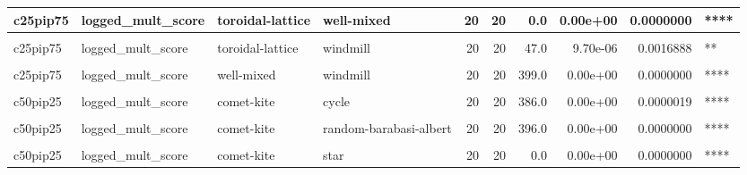 \documentclass[
]{book}
\begin{document}
\begin{table}
\begin{tabular}{l|l|l|l|r|r|r|r|r|l}
\hline
c25pip75 & logged\_mult\_score & toroidal-lattice & well-mixed & 20 & 20 & 0.0 & 0.00e+00 & 0.0000000 & ****\\
\hline
\cellcolor{gray!6}{c25pip75} & \cellcolor{gray!6}{logged\_mult\_score} & \cellcolor{gray!6}{toroidal-lattice} & \cellcolor{gray!6}{wheel} & \cellcolor{gray!6}{20} & \cellcolor{gray!6}{20} & \cellcolor{gray!6}{120.0} & \cellcolor{gray!6}{3.00e-02} & \cellcolor{gray!6}{1.0000000} & \cellcolor{gray!6}{ns}\\
\hline
c25pip75 & logged\_mult\_score & toroidal-lattice & windmill & 20 & 20 & 47.0 & 9.70e-06 & 0.0016888 & **\\
\hline
\cellcolor{gray!6}{c25pip75} & \cellcolor{gray!6}{logged\_mult\_score} & \cellcolor{gray!6}{well-mixed} & \cellcolor{gray!6}{wheel} & \cellcolor{gray!6}{20} & \cellcolor{gray!6}{20} & \cellcolor{gray!6}{387.0} & \cellcolor{gray!6}{0.00e+00} & \cellcolor{gray!6}{0.0000014} & \cellcolor{gray!6}{****}\\
\hline
c25pip75 & logged\_mult\_score & well-mixed & windmill & 20 & 20 & 399.0 & 0.00e+00 & 0.0000000 & ****\\
\hline
\cellcolor{gray!6}{c25pip75} & \cellcolor{gray!6}{logged\_mult\_score} & \cellcolor{gray!6}{wheel} & \cellcolor{gray!6}{windmill} & \cellcolor{gray!6}{20} & \cellcolor{gray!6}{20} & \cellcolor{gray!6}{166.0} & \cellcolor{gray!6}{3.69e-01} & \cellcolor{gray!6}{1.0000000} & \cellcolor{gray!6}{ns}\\
\hline
c50pip25 & logged\_mult\_score & comet-kite & cycle & 20 & 20 & 386.0 & 0.00e+00 & 0.0000019 & ****\\
\hline
\cellcolor{gray!6}{c50pip25} & \cellcolor{gray!6}{logged\_mult\_score} & \cellcolor{gray!6}{comet-kite} & \cellcolor{gray!6}{linear-chain} & \cellcolor{gray!6}{20} & \cellcolor{gray!6}{20} & \cellcolor{gray!6}{375.0} & \cellcolor{gray!6}{1.00e-07} & \cellcolor{gray!6}{0.0000299} & \cellcolor{gray!6}{****}\\
\hline
c50pip25 & logged\_mult\_score & comet-kite & random-barabasi-albert & 20 & 20 & 396.0 & 0.00e+00 & 0.0000000 & ****\\
\hline
\cellcolor{gray!6}{c50pip25} & \cellcolor{gray!6}{logged\_mult\_score} & \cellcolor{gray!6}{comet-kite} & \cellcolor{gray!6}{random-waxman} & \cellcolor{gray!6}{20} & \cellcolor{gray!6}{20} & \cellcolor{gray!6}{397.0} & \cellcolor{gray!6}{0.00e+00} & \cellcolor{gray!6}{0.0000000} & \cellcolor{gray!6}{****}\\
\hline
c50pip25 & logged\_mult\_score & comet-kite & star & 20 & 20 & 0.0 & 0.00e+00 & 0.0000000 & ****\\

\end{tabular}
\end{table}
\end{document}
